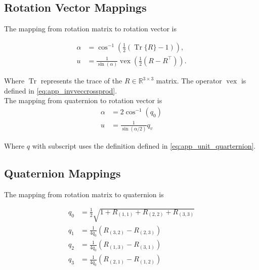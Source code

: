 \subsection{Rotation Vector Mappings}
The mapping from rotation matrix to rotation vector is 

\begin{subequations}
	\begin{align}
		\label{eq:app_rotmat2rotvec}
		\alpha &= \cos ^{-1}\left(\frac{1}{2}(\operatorname{Tr}\{R\}-1)\right),
		\\
		u &= \frac{1}{\sin (\alpha)} \operatorname{vex}\left(\frac{1}{2}\left(R-R^{\top}\right)\right).
	\end{align}
\end{subequations}



Where $\operatorname{Tr}$ represents the trace of the $R \in \mathbb{R}^{3 \times 3}$ matrix. The operator $\operatorname{vex}$ is defined in \eqref{eq:app_invveccrossprod}.\\
The mapping from quaternion to rotation vector is 
\begin{subequations}
	\begin{align}
		\label{eq:quat2rotvec}
		\alpha &=2 \cos ^{-1}\left(q_{0}\right) \\ 
		u &=\frac{1}{\sin (\alpha / 2)} q_v 
	\end{align}
\end{subequations}


Where $q$ with subscript uses the definition defined in \eqref{eq:app_unit_quarternion}.

\subsection{Quaternion Mappings}

The mapping from rotation matrix to quaternion is %

\begin{equation}
	\label{eq:app_rotmat2quat}
	\begin{aligned} q_{0} &=\frac{1}{2} \sqrt{1+R_{(1,1)}+R_{(2,2)}+R_{(3,3)}} \\ 
		q_{1} &=\frac{1}{4 q_{0}}\left(R_{(3,2)}-R_{(2,3)}\right) \\ 
		q_{2} &=\frac{1}{4 q_{0}}\left(R_{(1,3)}-R_{(3,1)}\right) \\ 
		q_{3} &=\frac{1}{4 q_{0}}\left(R_{(2,1)}-R_{(1,2)}\right) \end{aligned}
\end{equation}

